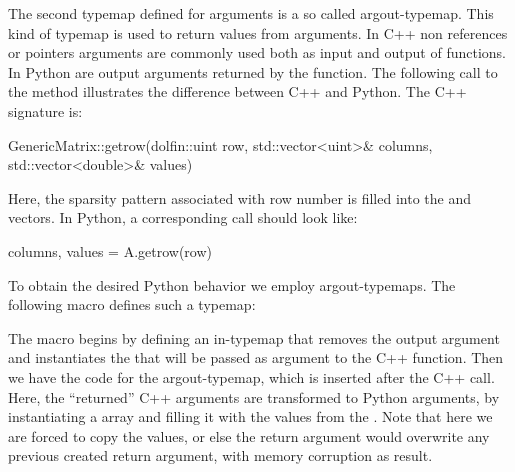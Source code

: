 The second typemap defined for  arguments is a so
called argout-typemap. This kind of typemap is used to return values
from arguments. In C++ non  references or pointers
arguments are commonly used both as input and output of functions. In
Python are output arguments returned by the function. The following
call to the  method illustrates the
difference between C++ and Python. The C++ signature is:
\begin{swigcode}
GenericMatrix::getrow(dolfin::uint row, std::vector<uint>& columns, std::vector<double>& values)
\end{swigcode}
Here, the sparsity pattern associated with row number  is
filled into the  and  vectors.  In Python, a
corresponding call should look like:
\begin{python}
columns, values = A.getrow(row)
\end{python}
To obtain the desired Python behavior we employ argout-typemaps. The
following macro defines such a typemap:
The macro begins by defining an in-typemap that removes the output
argument and instantiates the  that will be passed as
argument to the C++ function. Then we have the code for the
argout-typemap, which is inserted after the C++ call. Here, the
``returned'' C++ arguments are transformed to Python arguments, by
instantiating a \numpy array  and filling it with the values
from the . Note that here we are forced to copy the
values, or else the return argument would overwrite any previous
created return argument, with memory corruption as result.

